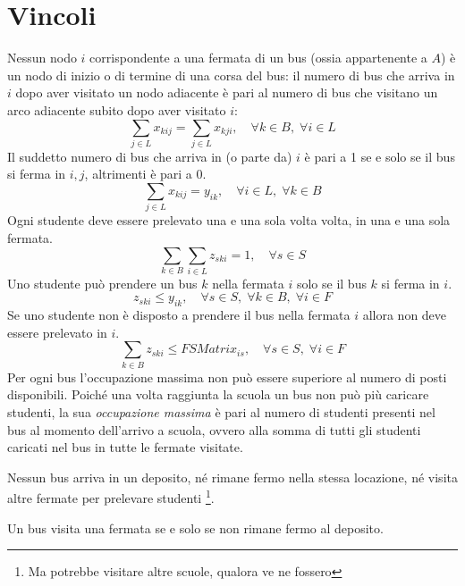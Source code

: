 \section{Vincoli}
Nessun nodo $i$ corrispondente a una fermata di un bus (ossia appartenente a $A$) è un nodo di inizio o di termine di una corsa del bus: il numero di bus che arriva in $i$ dopo aver visitato un nodo adiacente è pari al numero di bus che visitano un arco adiacente subito dopo aver visitato $i$:
\begin{equation}
    \sum_{j \in L} x_{kij} = \sum_{j \in L} x_{kji},\quad \forall k \in B,\;\forall i \in L
\end{equation}
Il suddetto numero di bus che arriva in (o parte da) $i$ è pari a 1 se e solo se il bus si ferma in $i,j$, altrimenti è pari a 0.
\begin{equation}
    \sum_{j \in L} x_{kij} = y_{ik},\quad \forall i \in L,\; \forall k \in B 
\end{equation}
Ogni studente deve essere prelevato una e una sola volta volta, in una e una sola fermata.
\begin{equation}
    \sum_{k \in B}\sum_{i \in L} z_{ski} = 1,\quad \forall s \in S
\end{equation}
Uno studente può prendere un bus $k$ nella fermata $i$ solo se il bus $k$ si ferma in $i$.
\begin{equation}
    z_{ski} \leq y_{ik},\quad \forall s \in S,\;\forall k \in B,\;\forall i \in F
\end{equation}
Se uno studente non è disposto a prendere il bus nella fermata $i$ allora non deve essere prelevato in $i$.
\begin{equation}
    \sum_{k \in B} z_{ski} \leq FSMatrix_{is},\quad \forall s \in S,\;\forall i \in F
\end{equation}
Per ogni bus l'occupazione massima non può essere superiore al numero di posti disponibili. Poiché una volta raggiunta la scuola un bus non può più caricare studenti, la sua \textit{occupazione massima} è pari al numero di studenti presenti nel bus al momento dell'arrivo a scuola, ovvero alla somma di tutti gli studenti caricati nel bus in tutte le fermate visitate. 


Nessun bus arriva in un deposito, né rimane fermo nella stessa locazione, né visita altre fermate per prelevare studenti \footnote{Ma potrebbe visitare altre scuole, qualora ve ne fossero}.

Un bus visita una fermata se e solo se non rimane fermo al deposito.

